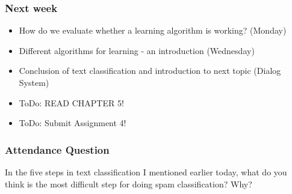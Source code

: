 \documentclass{beamer}
\begin{document}
\begin{frame}
\frametitle{Next week}
\begin{itemize}
\item How do we evaluate whether a learning algorithm is working? (Monday)
\item Different algorithms for learning - an introduction (Wednesday)
\item Conclusion of text classification and introduction to next topic (Dialog System)
\item ToDo: READ CHAPTER 5!
\item ToDo: Submit Assignment 4!
\end{itemize}
\end{frame}

\begin{frame}
\frametitle{Attendance Question}
In the five steps in text classification I mentioned earlier today, what do you think is the most difficult step for doing spam classification? Why?
\end{frame}
\end{document}
